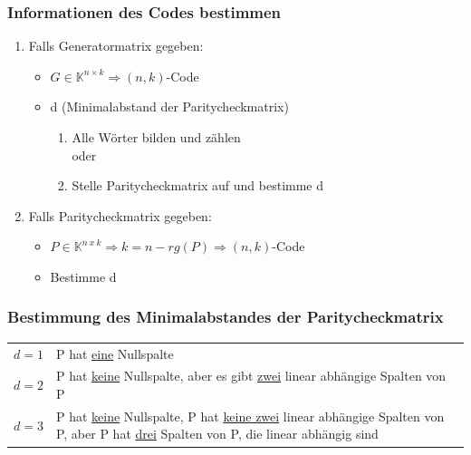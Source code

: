 \documentclass{scrartcl}
\begin{document}
\subsubsection{Informationen des Codes bestimmen}
    \begin{enumerate}
    \item Falls Generatormatrix gegeben:
        \begin{itemize}
        \item $G \in \mathbb{K}^{n \times k} \Rightarrow (n,k)$-Code
        \item d (Minimalabstand der Paritycheckmatrix)
            \begin{enumerate}
            \item Alle Wörter bilden und zählen\\
            oder
            \item Stelle Paritycheckmatrix auf und bestimme d
            \end{enumerate}
        \end{itemize}
    \item Falls Paritycheckmatrix gegeben:
        \begin{itemize}
        \item $P \in \mathbb{K}^{n~x~k} \Rightarrow k = n -rg(P) \Rightarrow (n,k)$-Code
        \item Bestimme d
        \end{itemize}
    \end{enumerate}


\subsubsection{Bestimmung des Minimalabstandes der Paritycheckmatrix}

\begin{tabular}{p{}p{}}
$d = 1$ & P hat \underline{eine} Nullspalte \\
$d = 2$ & P hat \underline{keine} Nullspalte, aber es gibt \underline{zwei} linear abhängige Spalten von P\\
$d = 3$ & P hat \underline{keine} Nullspalte, P hat  \underline{keine zwei} linear abhängige Spalten von P, aber P hat \underline{drei} Spalten von P, die linear abhängig sind\\
\end{tabular}
\end{document}
